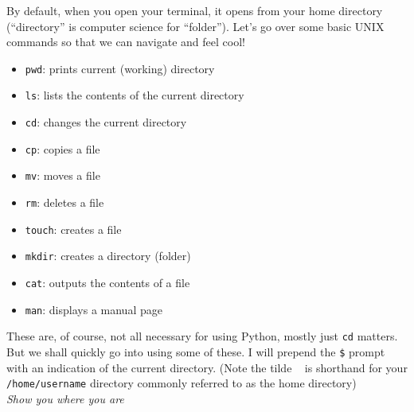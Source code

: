 \documentclass[12pt]{article}
\begin{document}
By default, when you open your terminal, it opens from your home directory (``directory'' is computer science for ``folder''). Let's go over some basic UNIX commands so that we can navigate and feel cool!
\begin{itemize} \item \texttt{pwd}: prints current (working) directory\end{itemize}
\begin{itemize} \item \texttt{ls}: lists the contents of the current directory\end{itemize}
\begin{itemize} \item \texttt{cd}: changes the current directory\end{itemize}
\begin{itemize} \item \texttt{cp}: copies a file\end{itemize}
\begin{itemize} \item \texttt{mv}: moves a file\end{itemize}
\begin{itemize} \item \texttt{rm}: deletes a file\end{itemize}
\begin{itemize} \item \texttt{touch}: creates a file\end{itemize}
\begin{itemize} \item \texttt{mkdir}: creates a directory (folder)\end{itemize}
\begin{itemize} \item \texttt{cat}: outputs the contents of a file\end{itemize}
\begin{itemize} \item \texttt{man}: displays a manual page\end{itemize}
These are, of course, not all necessary for using Python, mostly just \texttt{cd} matters. But we shall quickly go into using some of these. I will prepend the \texttt{\$} prompt with an indication of the current directory. (Note the tilde \texttt{~} is shorthand for your \texttt{/home/username} directory commonly referred to as the home directory)\\
\textit{Show you where you are}\\
\end{document}
